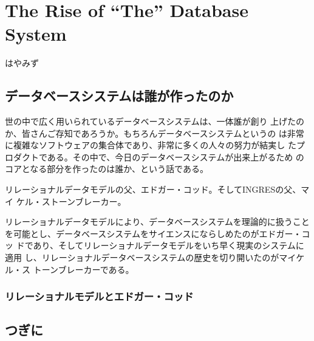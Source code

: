 
\cleardoublepage
\plainifnotempty

\chapter{The Rise of ``The'' Database System}

\begin{flushright}
はやみず
\end{flushright}


\section{データベースシステムは誰が作ったのか}

\lettrine{世}の中で広く用いられているデータベースシステムは、一体誰が創り
上げたのか、皆さんご存知であろうか。もちろんデータベースシステムというの
は非常に複雑なソフトウェアの集合体であり、非常に多くの人々の努力が結実し
たプロダクトである。その中で、今日のデータベースシステムが出来上がるため
のコアとなる部分を作ったのは誰か、という話である。

リレーショナルデータモデルの父、エドガー・コッド。そしてINGRESの父、マイ
ケル・ストーンブレーカー。

リレーショナルデータモデルにより、データベースシステムを理論的に扱うこと
を可能とし、データベースシステムをサイエンスにならしめたのがエドガー・コッ
ドであり、そしてリレーショナルデータモデルをいち早く現実のシステムに適用
し、リレーショナルデータベースシステムの歴史を切り開いたのがマイケル・ス
トーンブレーカーである。

\subsection{リレーショナルモデルとエドガー・コッド}



\section{つぎに}

